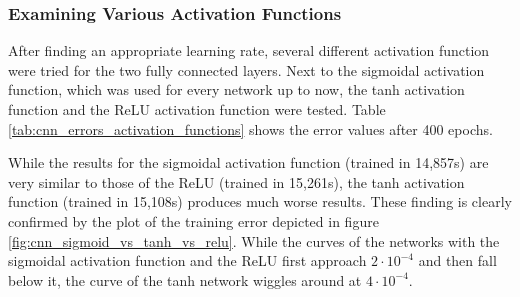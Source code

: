\documentclass[11pt, a4paper]{article}
\begin{document}
\subsubsection{Examining Various Activation Functions}

After finding an appropriate learning rate, several different activation function were tried for the two fully connected layers. Next to the sigmoidal activation function, which was used for every network up to now, the tanh activation function and the \ac{ReLU} activation function were tested. Table \ref{tab:cnn_errors_activation_functions} shows the error values after 400 epochs.

While the results for the sigmoidal activation function (trained in 14,857s) are very similar to those of the \ac{ReLU} (trained in 15,261s), the tanh activation function (trained in 15,108s) produces much worse results. These finding is clearly confirmed by the plot of the training error depicted in figure \ref{fig:cnn_sigmoid_vs_tanh_vs_relu}. While the curves of the networks with the sigmoidal activation function and the \ac{ReLU} first approach $2\cdot10^{-4}$ and then fall below it, the curve of the tanh network wiggles around at $4\cdot10^{-4}$.
\end{document}

